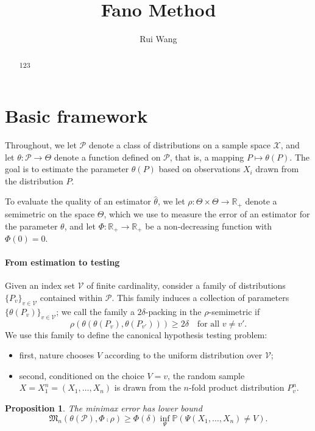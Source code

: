 \documentclass[11pt,letterpaper]{article}
\title{Fano Method}
\author{Rui Wang}
\date{\displaydate{date}}
\theoremstyle{plain}
\newtheorem{proposition}{\quad\quad Proposition}
\theoremstyle{definition}
\theoremstyle{remark}
\begin{document}
\maketitle
\begin{abstract}
    123
\end{abstract}
\section{Basic framework}
Throughout, we let $\mathcal{P}$ denote a class of distributions on a sample space $\mathcal{X}$, and let $\theta:\mathcal{P}\to \Theta$ denote a function defined on $\mathcal{P}$, that is, a mapping $P\mapsto \theta(P)$.
The goal is to estimate the parameter $\theta(P)$ based on observations $X_i$ drawn from the distribution $P$.

To evaluate the quality of an estimator $\hat{\theta}$, we let $\rho:\Theta\times\Theta \to \mathbb{R}_{+}$ denote a semimetric on the space $\Theta$, which we use to measure the error of an estimator for the parameter $\theta$, and let $\Phi:\mathbb{R}_+\to \mathbb{R}_+$ be a non-decreasing function with $\Phi(0)=0$.

\paragraph{From estimation to testing}
Given an index set $\mathcal{V}$ of finite cardinality, consider a family of distributions $\{P_v\}_{v\in\mathcal{V}}$ contained within $\mathcal{P}$.
This family induces a collection of parameters $\{\theta(P_v)\}_{v\in\mathcal{V}}$; we call the family a $2\delta$-packing in the $\rho$-semimetric if 
$$
\rho(\theta(\theta(P_v),\theta(P_{v'})))\geq 2\delta \quad \textrm{for all $v\neq v'$}.
$$
We use this family to define the canonical hypothesis testing problem:
\begin{itemize}
    \item
        first, nature chooses $V$ according to the uniform distribution over $\mathcal{V}$;
    \item
        second, conditioned on the choice $V=v$, the random sample $X=X_1^n=(X_1,\ldots,X_n)$ is drawn from  the $n$-fold product distribution $P_v^n$.
\end{itemize}
\begin{proposition}
    The minimax error has lower bound
    $$
    \mathfrak{M}_n(\theta(\mathcal{P}),\Phi\comp \rho)\geq \Phi(\delta) \inf_{\Psi} \mathbb{P}(\Psi(X_1,\ldots,X_n)\neq V).
    $$
\end{proposition}
\end{document}
